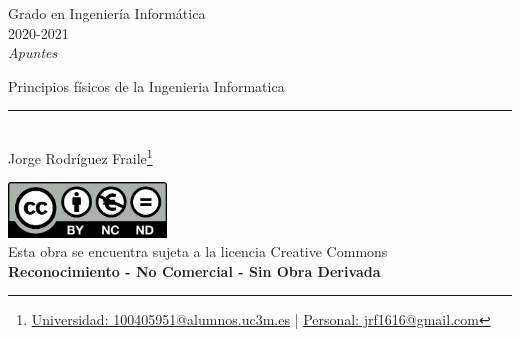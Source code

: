 \documentclass[12pt, twoside, openright]{report} %
\begin{document}
	
\begin{titlepage}
	\begin{sffamily}
	\color{azulUC3M}
	\begin{center}
		\begin{figure}[H] %
		\end{figure}
		\vspace{2.5cm}
		\begin{Large}
			Grado en Ingeniería Informática\\			
			2020-2021\\
			\vspace{2cm}		
			\textsl{Apuntes}\\
			\bigskip
		\end{Large}
		 	{\Huge Principios físicos de la Ingenieria Informatica}\\
		 	\vspace*{0.5cm}
	 		\rule{10.5cm}{0.1mm}\\
			\vspace*{0.9cm}
			{\LARGE Jorge Rodríguez Fraile\footnote{\href{mailto:100405951@alumnos.uc3m.es}{Universidad: 100405951@alumnos.uc3m.es}  |  \href{mailto:jrf1616@gmail.com}{Personal: jrf1616@gmail.com}}}\\ 
			\vspace*{1cm}
	\end{center}
	\vfill
	\color{black}
		\includegraphics[width=4.2cm]{img/creativecommons.png}\\
		Esta obra se encuentra sujeta a la licencia Creative Commons\\ \textbf{Reconocimiento - No Comercial - Sin Obra Derivada}
	\end{sffamily}
\end{titlepage}


\tableofcontents
\thispagestyle{fancy}
\end{document}
